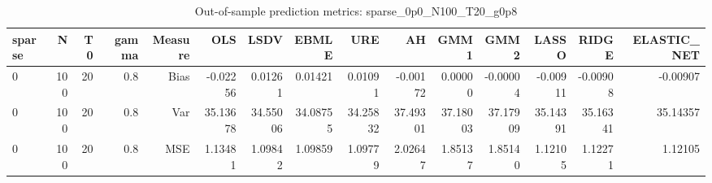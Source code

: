 \begin{table}[!htbp]\centering
\caption{Out-of-sample prediction metrics: sparse_0p0_N100_T20_g0p8}
\label{tab:table3_sparse_0p0_N100_T20_g0p8}
\begin{tabular}{lrrrrrrrrrrrrrr}
\hline
sparse & N & T0 & gamma & Measure & OLS & LSDV & EBMLE & URE & AH & GMM1 & GMM2 & LASSO & RIDGE & ELASTIC_NET \\
\hline
0 & 100 & 20 & 0.8 & Bias & -0.02256 & 0.01261 & 0.01421 & 0.01091 & -0.00172 & 0.00000 & -0.00004 & -0.00911 & -0.00908 & -0.00907 \\
0 & 100 & 20 & 0.8 & Var & 35.13678 & 34.55006 & 34.08755 & 34.25832 & 37.49301 & 37.18003 & 37.17909 & 35.14391 & 35.16341 & 35.14357 \\
0 & 100 & 20 & 0.8 & MSE & 1.13481 & 1.09842 & 1.09859 & 1.09779 & 2.02647 & 1.85137 & 1.85140 & 1.12105 & 1.12271 & 1.12105 \\
\hline
\end{tabular}
\end{table}

